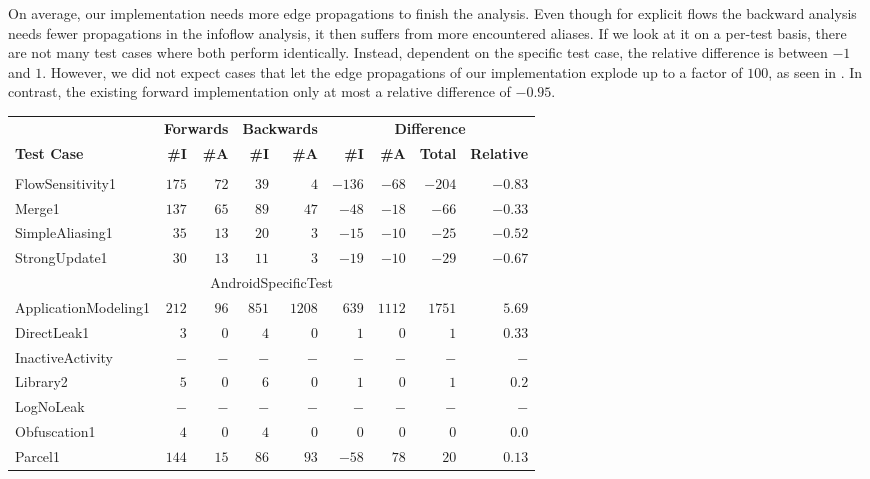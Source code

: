 \documentclass[../draft.tex]{subfiles}
\newcommand{\tsubEight}[1]{\multicolumn{9}{c}{#1}\\\hline}
\begin{document}
    On average, our implementation needs more edge propagations to finish the analysis.
    Even though for explicit flows the backward analysis needs fewer propagations in the infoflow analysis, it then suffers from more encountered aliases.
    If we look at it on a per-test basis, there are not many test cases where both perform identically.
    Instead, dependent on the specific test case, the relative difference is between $-1$ and $1$.
    However, we did not expect cases that let the edge propagations of our implementation explode up to a factor of $100$, as seen in .
    In contrast, the existing forward implementation only at most a relative difference of $-0.95$.

    \footnotesize
    \begin{longtable}{l | r | r | r | r | r | r | r | r}
        & \multicolumn{2}{c|}{\textbf{Forwards}} & \multicolumn{2}{c|}{\textbf{Backwards}} & \multicolumn{4}{c}{\textbf{Difference}}\\
        \multirow{-2}{*}{\textbf{Test Case}} & \textbf{\#I} & \textbf{\#A} & \textbf{\#I} & \textbf{\#A} & \textbf{\#I} & \textbf{\#A}& \textbf{Total} & \textbf{Relative}\\
        \hhline
        \endhead
        \tsubEight{AliasingTest}
        FlowSensitivity1 & $175$ & $72$ & $39$ & $4$ & $-136$ & $-68$ & $-204$ & $-0.83$\\
        Merge1 & $137$ & $65$ & $89$ & $47$ & $-48$ & $-18$ & $-66$ & $-0.33$\\
        SimpleAliasing1 & $35$ & $13$ & $20$ & $3$ & $-15$ & $-10$ & $-25$ & $-0.52$\\
        StrongUpdate1 & $30$ & $13$ & $11$ & $3$ & $-19$ & $-10$ & $-29$ & $-0.67$\\
        \hline
        \tsubEight{AndroidSpecificTest}
        ApplicationModeling1 & $212$ & $96$ & $851$ & $1208$ & $639$ & $1112$ & $1751$ & $5.69$\\
        DirectLeak1 & $3$ & $0$ & $4$ & $0$ & $1$ & $0$ & $1$ & $0.33$\\
        InactiveActivity & $-$ & $-$ & $-$ & $-$ & $-$ & $-$ & $-$ & $-$\\
        Library2 & $5$ & $0$ & $6$ & $0$ & $1$ & $0$ & $1$ & $0.2$\\
        LogNoLeak & $-$ & $-$ & $-$ & $-$ & $-$ & $-$ & $-$ & $-$\\
        Obfuscation1 & $4$ & $0$ & $4$ & $0$ & $0$ & $0$ & $0$ & $0.0$\\
        Parcel1 & $144$ & $15$ & $86$ & $93$ & $-58$ & $78$ & $20$ & $0.13$\\

\end{longtable}
\end{document}

